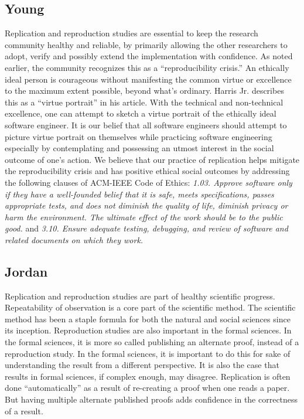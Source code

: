 \subsection{Young} Replication and reproduction studies are essential to keep the research community healthy and reliable, by primarily allowing the other researchers to adopt, verify and possibly extend the implementation with confidence. As noted earlier, the community recognizes this as a ``reproducibility crisis.''
An ethically ideal person is courageous without manifesting the common virtue or excellence to the maximum extent possible, beyond what’s ordinary. Harris Jr. describes this as a ``virtue portrait'' in his article. \cite{harris_good_2008}
With the technical and non-technical excellence, one can attempt to sketch a virtue portrait of the ethically ideal software engineer. It is our belief that all software engineers should attempt to picture virtue portrait on themselves while practicing software engineering especially by contemplating and possessing an utmost interest in the social outcome of one's action. We believe that our practice of replication helps mitigate the reproducibility crisis and has positive ethical social outcomes by addressing the following clauses of ACM-IEEE Code of Ethics: \textit{1.03. Approve software only if they have a well-founded belief that it is safe, meets specifications, passes appropriate tests, and does not diminish the quality of life, diminish privacy or harm the environment. The ultimate effect of the work should be to the public good.} and \textit{3.10. Ensure adequate testing, debugging, and review of software and related documents on which they work.} 


\subsection{Jordan}
Replication and reproduction studies are part of healthy scientific progress. Repeatability of observation is a core part of the scientific method. The scientific method has been a staple formula for both the natural and social sciences since its inception. Reproduction studies are also important in the formal sciences. In the formal sciences, it is more so called publishing an alternate proof, instead of a reproduction study. In the formal sciences, it is important to do this for sake of understanding the result from a different perspective. It is also the case that results in formal sciences, if complex enough, may disagree. \cite{lipton_social_1979} Replication is often done ``automatically'' as a result of re-creating a proof when one reads a paper. But having multiple alternate published proofs adds confidence in the correctness of a result.

